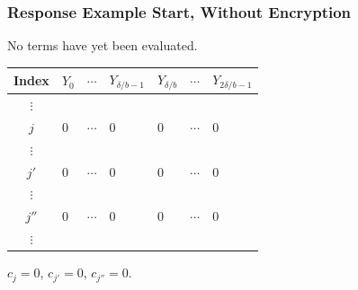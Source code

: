 \documentclass{beamer}
\makeatletter
\DeclareRobustCommand*{\&}{%
  \nfss@text{%
    \fontfamily{LinuxBiolinumT-TLF}%
    \selectfont
    \symbol{`\&}%
  }%
}
\makeatother
\begin{document}
\begin{frame}
  \frametitle{Response Example Start, Without Encryption}
  No terms have yet been evaluated.
  \begin{center}
  \begin{tabular}{c  C{1.55cm}  c  C{1.55cm}  C{1.55cm}  c  C{1.55cm}  }
   {\scriptsize Index}             & $Y_0$\qquad            & $\cdots$\qquad         & $Y_{\delta/b-1}$\qquad & $Y_{\delta/b}$\qquad   & $\cdots$\qquad         & $Y_{2\delta/b-1}$\qquad\\\toprule
    $\vdots$ & \\
 {\footnotesize$j$} & 0                        & $\cdots$                         & 0                         & 0                         & $\cdots$                         & 0                         \\
    $\vdots$ & \\
 {\footnotesize$j'$}  & 0                      & $\cdots$                           & 0                           & 0                      & $\cdots$                           & 0\\
    $\vdots$ & \\
     {\footnotesize$j''$}  & 0 & $\cdots$                           & 0         & 0                      & $\cdots$                           & 0\\
    $\vdots$ & \\\bottomrule
  \end{tabular}
  \end{center}
  $c_{j} = 0$, $c_{j'} = 0$, $c_{j''} = 0$.
\end{frame}
\end{document}
